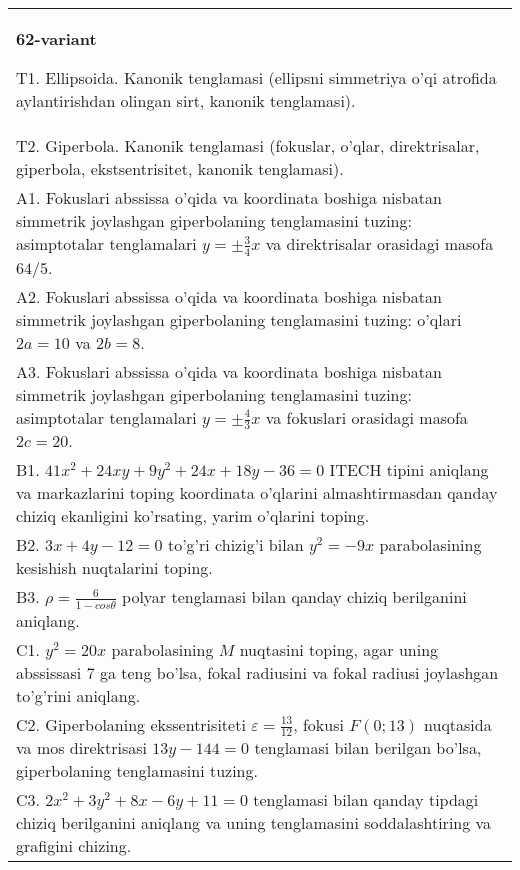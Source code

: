 \documentclass{article}
\begin{document}
\begin{tabular}{m{17cm}}
\textbf{62-variant}
\newline

T1. Ellipsoida. Kanonik tenglamasi (ellipsni simmetriya o'qi atrofida aylantirishdan olingan sirt, kanonik tenglamasi).\\

T2. Giperbola. Kanonik tenglamasi (fokuslar, o'qlar, direktrisalar, giperbola, ekstsentrisitet, kanonik tenglamasi).\\

A1. Fokuslari abssissa o'qida va koordinata boshiga nisbatan simmetrik joylashgan giperbolaning tenglamasini tuzing: asimptotalar tenglamalari $y=\pm \frac{3}{4}x$ va direktrisalar orasidagi masofa $64/5$.\\

A2. Fokuslari abssissa o'qida va koordinata boshiga nisbatan simmetrik joylashgan giperbolaning tenglamasini tuzing: o'qlari $2a=10$ va $2b=8$.\\

A3. Fokuslari abssissa o'qida va koordinata boshiga nisbatan simmetrik joylashgan giperbolaning tenglamasini tuzing: asimptotalar tenglamalari $y=\pm \frac{4}{3}x$ va fokuslari orasidagi masofa $2c=20$.\\

B1. $41x^{2} + 24xy + 9y^{2} + 24x + 18y - 36 = 0$ ITECH tipini aniqlang va markazlarini toping koordinata o'qlarini almashtirmasdan qanday chiziq ekanligini ko'rsating, yarim o'qlarini toping.  \\

B2. $3x + 4y - 12 = 0$ to'g'ri chizig'i bilan $y^{2} = - 9x$ parabolasining kesishish nuqtalarini toping.  \\

B3. $\rho = \frac{6}{1 - cos\theta}$ polyar tenglamasi bilan qanday chiziq berilganini aniqlang.  \\

C1. $y^{2} = 20x$ parabolasining $M$ nuqtasini toping, agar uning abssissasi 7 ga teng bo'lsa, fokal radiusini va fokal radiusi joylashgan to'g'rini aniqlang.\\

C2. Giperbolaning ekssentrisiteti $\varepsilon = \frac{13}{12}$, fokusi $F(0;13)$ nuqtasida va mos direktrisasi $13y - 144 = 0$ tenglamasi bilan berilgan bo'lsa, giperbolaning tenglamasini tuzing.  \\

C3. $2x^{2} + 3y^{2} + 8x - 6y + 11 = 0$ tenglamasi bilan qanday tipdagi chiziq berilganini aniqlang va uning tenglamasini soddalashtiring va grafigini chizing.  \\

\end{tabular}
\vspace{1cm}
\end{document}
